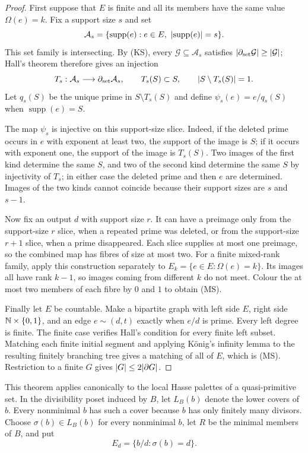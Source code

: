 \begin{proof}
First suppose that $E$ is finite and all its members have the same value
$\Omega(e)=k$.  Fix a support size $s$ and set
\[
  \mathcal A_s=\{\operatorname{supp}(e):e\in E,
                  \ \lvert \operatorname{supp}(e)\rvert=s\}.
\]
This set family is intersecting.  By (KS), every
$\mathcal G\subseteq\mathcal A_s$ satisfies
$\lvert \partial_{\rm set}\mathcal G\rvert\geq\lvert \mathcal G\rvert$; Hall's
theorem therefore gives an injection
\[
  T_s:\mathcal A_s\longrightarrow\partial_{\rm set}\mathcal A_s,
  \qquad T_s(S)\subset S,
  \qquad\lvert S\setminus T_s(S)\rvert=1.
\]
Let $q_s(S)$ be the unique prime in $S\setminus T_s(S)$ and define
$\psi_s(e)=e/q_s(S)$ when $\operatorname{supp}(e)=S$.

The map $\psi_s$ is injective on this support-size slice.  Indeed, if the
deleted prime occurs in $e$ with exponent at least two, the support of the
image is $S$; if it occurs with exponent one, the support of the image is
$T_s(S)$.  Two images of the first kind determine the same $S$, and two of
the second kind determine the same $S$ by injectivity of $T_s$; in either
case the deleted prime and then $e$ are determined.  Images of the two kinds
cannot coincide because their support sizes are $s$ and $s-1$.

Now fix an output $d$ with support size $r$.  It can have a preimage only
from the support-size $r$ slice, when a repeated prime was deleted, or from
the support-size $r+1$ slice, when a prime disappeared.  Each slice supplies
at most one preimage, so the combined map has fibres of size at most two.
For a finite mixed-rank family, apply this construction separately to
$E_k=\{e\in E:\Omega(e)=k\}$.  Its images all have rank $k-1$, so images
coming from different $k$ do not meet.  Colour the at most two members of
each fibre by $0$ and $1$ to obtain (MS).

Finally let $E$ be countable.  Make a bipartite graph with left side $E$,
right side $\mathbb N\times\{0,1\}$, and an edge
$e\sim(d,t)$ exactly when $e/d$ is prime.  Every left degree is finite.
The finite case verifies Hall's condition for every finite left subset.
Matching each finite initial segment and applying K\"onig's infinity lemma
to the resulting finitely branching tree gives a matching of all of $E$,
which is (MS).  Restriction to a finite $G$ gives
$\lvert G\rvert\leq2\lvert \partial G\rvert$.
\end{proof}

This theorem applies canonically to the local Hasse palettes of a
quasi-primitive set.  In the divisibility poset induced by $B$, let
$L_B(b)$ denote the lower covers of $b$.  Every nonminimal $b$ has such a
cover because $b$ has only finitely many divisors.  Choose
$\sigma(b)\in L_B(b)$ for every nonminimal $b$, let $R$ be the minimal
members of $B$, and put
\[
  E_d=\{b/d:\sigma(b)=d\}.
\]

